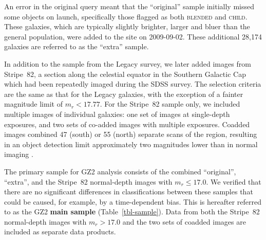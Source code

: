 \documentclass[useAMS,usenatbib]{mn2e}
\begin{document}
An error in the original query meant that the ``original'' sample initially missed some objects on launch, specifically those flagged as both \textsc{blended} and \textsc{child}. These galaxies, which are typically slightly brighter, larger and bluer than the general population, were added to the site on 2009-09-02. %
These additional 28,174 galaxies are referred to as the ``extra'' sample. 

In addition to the sample from the Legacy survey, we later added images from Stripe~82, a section along the celestial equator in the Southern Galactic Cap which had been repeatedly imaged during the SDSS survey. The selection criteria are the same as that for the Legacy galaxies, with the exception of a fainter magnitude limit of $m_r < 17.77$. For the Stripe~82 sample only, we included multiple images of individual galaxies: one set of images at single-depth exposures, and two sets of co-added images with multiple exposures. Coadded images combined 47 (south) or 55 (north) separate scans of the region, resulting in an object detection limit approximately two magnitudes lower than in normal imaging \citep{ann11}. 

The primary sample for GZ2 analysis consists of the combined ``original'', ``extra'', and the Stripe~82 normal-depth images with $m_r\leq17.0$. We verified that there are no significant differences in classifications between these samples that could be caused, for example, by a time-dependent bias. This is hereafter referred to as the GZ2 {\bf main sample} (Table~\ref{tbl-sample}). Data from both the Stripe~82 normal-depth images with $m_r>17.0$ and the two sets of coadded images are included as separate data products. 
\end{document}
